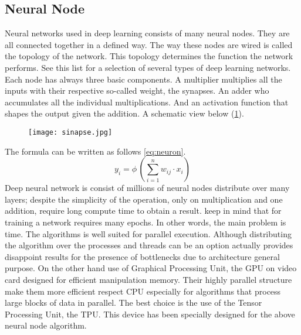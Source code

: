 \subsection{Neural Node}
\label{ssec:hard-neural-node}
Neural networks used in deep learning consists of many neural nodes. They are
all connected together in a defined way. The way these nodes are wired is
called the topology of the network. This topology determines the function the
network performs. See this list for a selection of several types of deep
learning networks. Each node has always three basic components. 
A multiplier multiplies all the inputs with their respective so-called weight,
the synapses. An adder who accumulates all the individual multiplications. And
an activation function that shapes the output given the addition. A schematic
view below (\ref{fig:neuron}).\hfill \break
%
\begin{figure}[htb]
	\centering
  \texttt{[image: sinapse.jpg]}
  \label{fig:neuron}
\end{figure}
%
\newpage
\noindent The formula can be written as follows \eqref{eq:neuron}.
\begin{equation}
\label{eq:neuron}
	y_{i} = \phi \, \left(\sum_{i=1}^{n} w_{ij}\cdot x_{i} \right)
\end{equation}
%
Deep neural network is consist of millions of neural nodes distribute over many
layers; despite the simplicity of the operation, only on multiplication and one
addition, require long compute time to obtain a result. keep in mind that for
training a network requires many epochs. In other words, the main problem is
time. The algorithms is well suited for parallel execution. Although
distributing the algorithm over the processes and threads can be an option
actually provides disappoint results for the presence of bottlenecks due to
architecture general purpose. On the other hand use of Graphical Processing
Unit, the GPU on video card designed for efficient manipulation memory. Their
highly parallel structure make them more efficient respect CPU especially for
algorithms that process large blocks of data in parallel. The best choice is the
use of the Tensor Processing Unit, the TPU. This device has been specially
designed for the above neural node algorithm.
%
